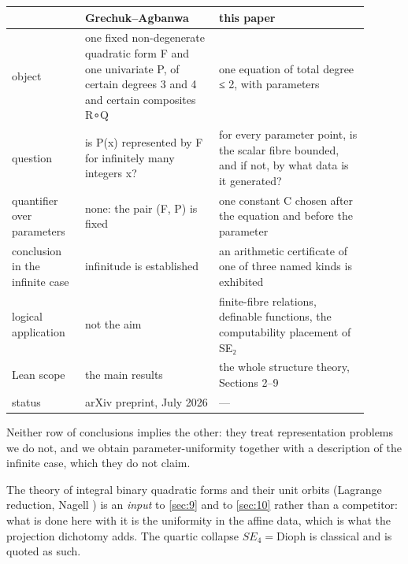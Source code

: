 \begin{longtable}{@{}>{\raggedright\arraybackslash}p{0.187\linewidth}>{\raggedright\arraybackslash}p{0.338\linewidth}>{\raggedright\arraybackslash}p{0.375\linewidth}@{}}
\toprule
 & Grechuk–Agbanwa \cite{GA26} & this paper \\
\midrule\endhead
object & one fixed non-degenerate quadratic form F and one univariate P, of certain degrees 3 and 4 and certain composites R∘Q & one equation of total degree ≤ 2, with parameters \\
question & is P(x) represented by F for infinitely many integers x? & for every parameter point, is the scalar fibre bounded, and if not, by what data is it generated? \\
quantifier over parameters & none: the pair (F, P) is fixed & one constant C chosen after the equation and before the parameter \\
conclusion in the infinite case & infinitude is established & an arithmetic certificate of one of three named kinds is exhibited \\
logical application & not the aim & finite-fibre relations, definable functions, the computability placement of SE₂ \\
Lean scope & the main results & the whole structure theory, Sections 2–9 \\
status & ar\allowbreak{}Xiv preprint, July 2026 & — \\
\bottomrule
\end{longtable}
Neither row of conclusions implies the other: they treat representation problems we do not, and we obtain parameter-uniformity together with a description of the infinite case, which they do not claim.

The theory of integral binary quadratic forms and their unit orbits (Lagrange reduction, Nagell \cite{Nag}) is an \emph{input} to \cref{sec:9} and to \cref{sec:10} rather than a competitor: what is done here with it is the uniformity in the affine data, which is what the projection dichotomy adds. The quartic collapse $SE_{4} = \mathrm{Dioph}$ is classical and is quoted as such.

